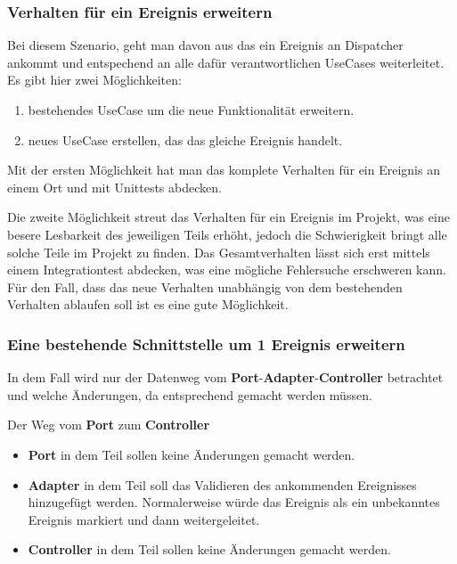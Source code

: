 \documentclass{article}
\begin{document}
    \subsubsection{Verhalten für ein Ereignis erweitern}
    \label{Verhalten für ein Ereignis erweitern}
    Bei diesem Szenario, geht man davon aus das ein Ereignis an Dispatcher ankommt und entspechend an alle dafür 
    verantwortlichen UseCases weiterleitet. 
    Es gibt hier zwei Möglichkeiten:
    \begin{enumerate}
        \item bestehendes UseCase um die neue Funktionalität erweitern.
        \item neues UseCase erstellen, das das gleiche Ereignis handelt.
    \end{enumerate}

    Mit der ersten Möglichkeit hat man das komplete Verhalten für ein Ereignis an einem Ort und mit Unittests abdecken.

    Die zweite Möglichkeit streut das Verhalten für ein Ereignis im Projekt, was eine besere Lesbarkeit des jeweiligen Teils erhöht,
    jedoch die Schwierigkeit bringt alle solche Teile im Projekt zu finden. Das Gesamtverhalten lässt sich erst mittels
    einem Integrationtest abdecken, was eine mögliche Fehlersuche erschweren kann. 
    Für den Fall, dass das neue Verhalten unabhängig von dem bestehenden Verhalten ablaufen soll ist es eine gute Möglichkeit.
    
    \subsubsection{Eine bestehende Schnittstelle um 1 Ereignis erweitern}
    In dem Fall wird nur der Datenweg vom \textbf{Port}-\textbf{Adapter}-\textbf{Controller} betrachtet und welche Änderungen,
    da entsprechend gemacht werden müssen.

    Der Weg vom \textbf{Port} zum \textbf{Controller}

    \begin{itemize}
        \item \textbf{Port} in dem Teil sollen keine Änderungen gemacht werden.
        \item \textbf{Adapter} in dem Teil soll das Validieren des ankommenden Ereignisses hinzugefügt werden. Normalerweise würde 
        das Ereignis als ein unbekanntes Ereignis markiert und dann weitergeleitet.
        \item \textbf{Controller} in dem Teil sollen keine Änderungen gemacht werden.
    \end{itemize}
\end{document}
